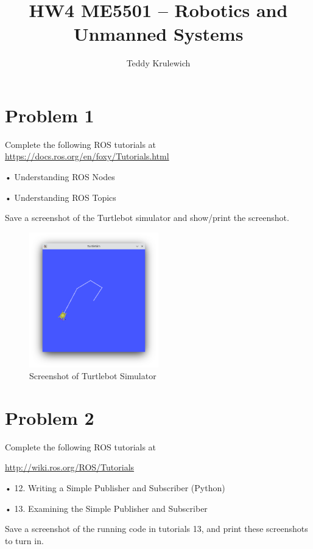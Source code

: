 \documentclass{article}
\author{Teddy Krulewich}
\title{\vspace{-4em}HW4 ME5501 – Robotics and Unmanned Systems}
\begin{document}
\maketitle

\section*{Problem 1}
Complete the following ROS tutorials at \url{https://docs.ros.org/en/foxy/Tutorials.html}

• Understanding ROS Nodes

• Understanding ROS Topics

\bigskip
\noindent Save a screenshot of the Turtlebot simulator and show/print the screenshot.


\begin{figure}[H]
  \centering
  \includegraphics[width=0.5\textwidth]{question1.png}
  \caption*{Screenshot of Turtlebot Simulator}
\end{figure}

\section*{Problem 2}

Complete the following ROS tutorials at

\url{http://wiki.ros.org/ROS/Tutorials}


• 12. Writing a Simple Publisher and Subscriber (Python) 


• 13. Examining the Simple Publisher and Subscriber 

\bigskip 
\noindent Save a screenshot of the running code in tutorials 13, and print these screenshots to turn in.
\end{document}
